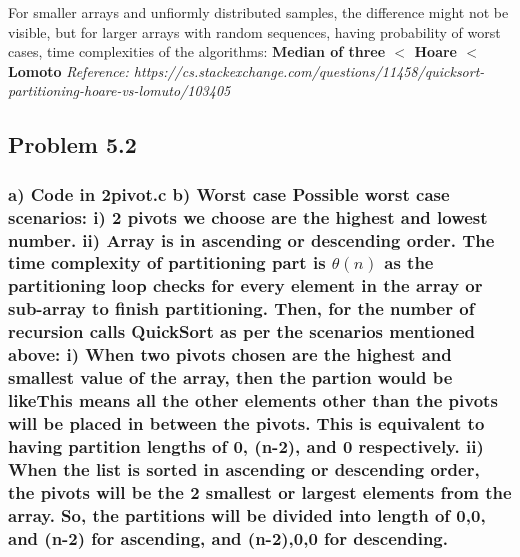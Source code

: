 \documentclass[a4paper,12pt]{article}
\begin{document}
{{For smaller arrays and unfiormly distributed samples, the difference might not be visible, but for larger arrays with random sequences, having probability of worst cases, time complexities of the algorithms:\newline
\textbf{Median of three $<$  Hoare $<$  Lomoto\newline \newline}
\textit{Reference: https://cs.stackexchange.com/questions/11458/quicksort-partitioning-hoare-vs-lomuto/103405} }}

\subsection*{\newpage Problem 5.2 \newline\newline}
\subsubsection*{\textnormal{a) Code in 2pivot.c \newline\newline
b)\textbf{ Worst case} \newline \newline
Possible worst case scenarios: \newline 
i) 2 pivots we choose are the highest and lowest number. \newline
ii) Array is in ascending or descending order. \newline \newline
The time complexity of partitioning part is $ \theta (n) $  as the partitioning loop checks for every element in the array or sub-array to finish partitioning.
Then, for the number of recursion calls QuickSort as per the scenarios mentioned above: \newline \newline
i) When two pivots chosen are the highest and smallest value of the array, then the partion would be like\newline  [pivot 1] [ ..$ >=$   pivot1   and  $ <= $ pivot 2   ..] [pivot 2]
\newline This means all the other elements other than the pivots will be placed in between the pivots. This is equivalent to having partition lengths of 0, (n-2), and 0 respectively.\newline\newline
ii) When the list is sorted in ascending or descending order, the pivots will be the 2 smallest or largest elements from the array. So, the partitions will be divided into length of 0,0, and (n-2) for ascending, and (n-2),0,0 for descending. \newline\newline
}}
\end{document}
